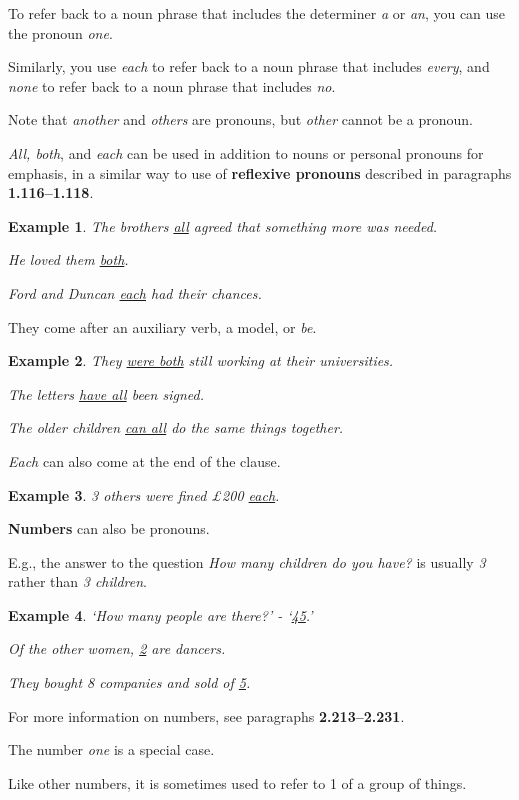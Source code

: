 \documentclass[oneside]{book}
\numberwithin{equation}{section}
\newtheorem{example}{Example}[section]
\begin{document}
%
To refer back to a noun phrase that includes the determiner \textit{a} or \textit{an}, you can use the pronoun \textit{one}.

Similarly, you use \textit{each} to refer back to a noun phrase that includes \textit{every}, and \textit{none} to refer back to a noun phrase that includes \textit{no}.

%
Note that \textit{another} and \textit{others} are pronouns, but \textit{other} cannot be a pronoun.

%
\noindent{} \textit{All, both}, and \textit{each} can be used in addition to nouns or personal pronouns for emphasis, in a similar way to use of \textbf{reflexive pronouns} described in paragraphs \textbf{1.116--1.118}.
\begin{example}
    The brothers \underline{all} agreed that something more was needed.
    
    He loved them \underline{both}.
    
    Ford and Duncan \underline{each} had their chances.
\end{example}
They come after an auxiliary verb, a model, or \textit{be}.
\begin{example}
    They \underline{were both} still working at their universities.
    
    The letters \underline{have all} been signed.
    
    The older children \underline{can all} do the same things together.
\end{example}
\textit{Each} can also come at the end of the clause.
\begin{example}
    3 others were fined \pounds200 \underline{each}.
\end{example}
%
\noindent{} \textbf{Numbers} can also be pronouns.

E.g., the answer to the question \textit{How many children do you have?} is usually \textit{3} rather than \textit{3 children}.
\begin{example}
    `How many people are there?' - `\underline{45}.'
    
    Of the other women, \underline{2} are dancers.
    
    They bought 8 companies and sold of \underline{5}.
\end{example}
For more information on numbers, see paragraphs \textbf{2.213--2.231}.

%
\noindent{} The number \textit{one} is a special case.

Like other numbers, it is sometimes used to refer to 1 of a group of things.
\end{document}
